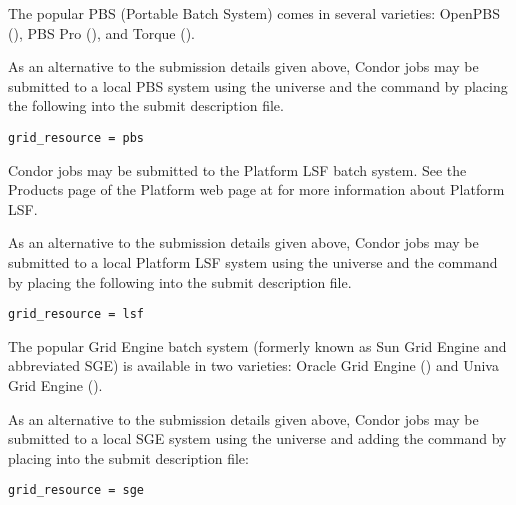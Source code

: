 
The popular PBS (Portable Batch System) comes in
several varieties: OpenPBS (),
PBS Pro (), and
Torque
().

As an alternative to the submission details given above,
Condor jobs may be submitted to a local PBS system
using the  universe and the
 command by placing the following
into the submit description file.
\begin{verbatim}
grid_resource = pbs
\end{verbatim}




Condor jobs may be submitted to the Platform LSF batch system.
See the Products page of the Platform web page at
for more information about Platform LSF.

As an alternative to the submission details given above,
Condor jobs may be submitted to a local Platform LSF system
using the  universe and the
 command  by placing the following
into the submit description file.
\begin{verbatim}
grid_resource = lsf
\end{verbatim}




The popular Grid Engine batch system (formerly known as Sun Grid Engine and
abbreviated SGE) is available in two varieties:
Oracle Grid Engine
()
and Univa Grid Engine
().

As an alternative to the submission details given above,
Condor jobs may be submitted to a local SGE system
using the  universe and adding the
 command by placing
into the submit description file:
\begin{verbatim}
grid_resource = sge
\end{verbatim}

